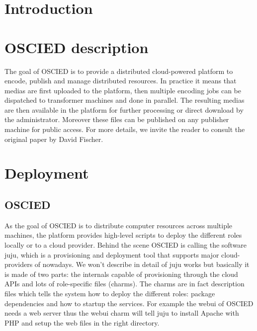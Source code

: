 \documentclass[a4paper,12pt]{article}
\begin{document}
%

\tableofcontents

\newpage

\section{Introduction}

\section{OSCIED description}
The goal of OSCIED is to provide a distributed cloud-powered platform to encode, publish and manage distributed resources.
In practice it means that medias are first uploaded to the platform, then multiple encoding jobs can be dispatched to transformer machines and done in parallel.
The resulting medias are then available in the platform for further processing or direct download by the administrator.
Moreover these files can be published on any publisher machine for public access.
For more details, we invite the reader to consult the original paper by David Fischer. %


\section{Deployment}
\subsection{OSCIED}
As the goal of OSCIED is to distribute computer resources across multiple machines, the platform provides high-level scripts to deploy the different roles locally or to a cloud provider.
Behind the scene OSCIED is calling the software juju, which is a provisioning and deployment tool that supports major cloud-providers of nowadays.
We won't describe in detail of juju works but basically it is made of two parts: the internals capable of provisioning through the cloud APIs and lots of role-specific files (charms).
The charms are in fact description files which tells the system how to deploy the different roles: package dependencies and how to startup the services.
For example the webui of OSCIED needs a web server thus the webui charm will tell juju to install Apache with PHP and setup the web files in the right directory.
\end{document}
